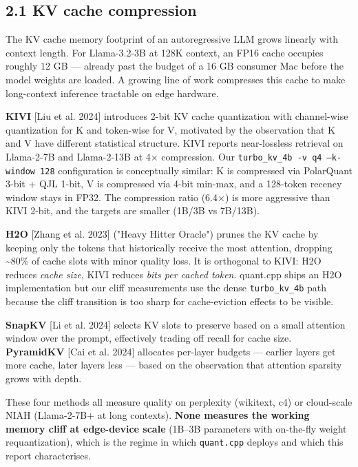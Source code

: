 \documentclass[11pt]{article}
\begin{document}
\subsection*{2.1 KV cache compression}


The KV cache memory footprint of an autoregressive LLM grows linearly with context length. For Llama-3.2-3B at 128K context, an FP16 cache occupies roughly 12 GB — already past the budget of a 16 GB consumer Mac before the model weights are loaded. A growing line of work compresses this cache to make long-context inference tractable on edge hardware.


\textbf{KIVI} [Liu et al. 2024] introduces 2-bit KV cache quantization with channel-wise quantization for K and token-wise for V, motivated by the observation that K and V have different statistical structure. KIVI reports near-lossless retrieval on Llama-2-7B and Llama-2-13B at 4× compression. Our \texttt{turbo\_kv\_4b -v q4 --k-window 128} configuration is conceptually similar: K is compressed via PolarQuant 3-bit + QJL 1-bit, V is compressed via 4-bit min-max, and a 128-token recency window stays in FP32. The compression ratio (6.4×) is more aggressive than KIVI 2-bit, and the targets are smaller (1B/3B vs 7B/13B).


\textbf{H2O} [Zhang et al. 2023] ("Heavy Hitter Oracle") prunes the KV cache by keeping only the tokens that historically receive the most attention, dropping \textasciitilde{}80\% of cache slots with minor quality loss. It is orthogonal to KIVI: H2O reduces \textit{cache size}, KIVI reduces \textit{bits per cached token}. quant.cpp ships an H2O implementation but our cliff measurements use the dense \texttt{turbo\_kv\_4b} path because the cliff transition is too sharp for cache-eviction effects to be visible.


\textbf{SnapKV} [Li et al. 2024] selects KV slots to preserve based on a small attention window over the prompt, effectively trading off recall for cache size. \textbf{PyramidKV} [Cai et al. 2024] allocates per-layer budgets — earlier layers get more cache, later layers less — based on the observation that attention sparsity grows with depth.


These four methods all measure quality on perplexity (wikitext, c4) or cloud-scale NIAH (Llama-2-7B+ at long contexts). \textbf{None measures the working memory cliff at edge-device scale} (1B–3B parameters with on-the-fly weight requantization), which is the regime in which \texttt{quant.cpp} deploys and which this report characterises.
\end{document}
